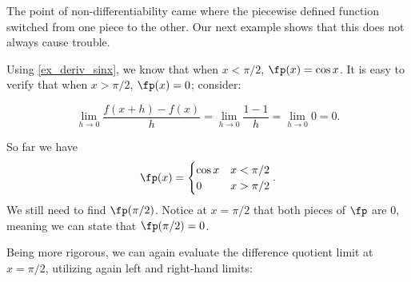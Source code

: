 The point of non-differentiability came where the piecewise defined function switched from one piece to the other. Our next example shows that this does not always cause trouble.\bigskip

{Using \autoref{ex_deriv_sinx}, we know that when $x<\pi/2$, $\fp(x) = \cos x$. It is easy to verify that when $x>\pi/2$, $\fp(x) = 0$; consider:


\[
 \lim_{h\to0}\frac{f(x+h) - f(x)}{h}
 = \lim_{h\to0}\frac{1-1}{h} = \lim_{h\to0}0 =0.
\]

So far we have
\[\fp(x) = \begin{cases}\cos x & x<\pi/2\\ 0 & x>\pi/2\end{cases}.\]
We still need to find $\fp(\pi/2)$. Notice at $x=\pi/2$ that both pieces of $\fp$ are 0, meaning we can state that $\fp(\pi/2)=0$. 

Being more rigorous, we can again evaluate the difference quotient limit at $x=\pi/2$, utilizing again left and right-hand limits:\\

}
